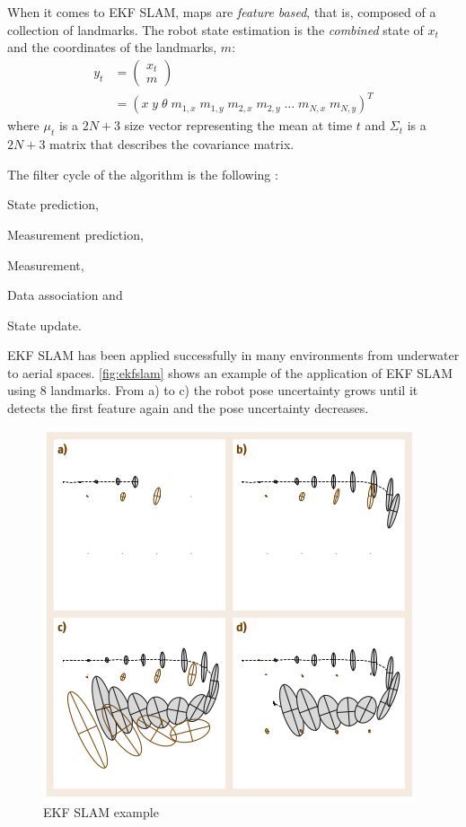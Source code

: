 When it comes to EKF SLAM, maps are \emph{feature based}, that is, composed of a collection of landmarks. The robot state estimation is the \emph{combined} state of $x_t$ and the coordinates of the landmarks, $m$:
\begin{equation}
  \begin{split}
    y_t & = \begin{pmatrix} x_t \\ m \end{pmatrix} \\
        & = (x\; y\; \theta\; m_{1,x}\; m_{1,y}\; m_{2,x}\; m_{2,y}\; \ldots\; m_{N,x}\; m_{N,y})^T
  \end{split}
  \label{eq:combinedstate}
\end{equation}  
where $\mu_t$ is a $2N+3$ size vector representing the mean at time $t$ and $\Sigma_t$ is a $2N+3$ matrix that describes the covariance matrix.

The filter cycle of the algorithm is the following : \begin{enumerate*} \item State prediction, \item Measurement prediction, \item Measurement, \item Data association and \item State update.\end{enumerate*}
 

EKF SLAM has been applied successfully in many environments from underwater to aerial spaces. \autoref{fig:ekfslam} shows an example of the application of EKF SLAM using 8 landmarks. From a) to c) the robot pose uncertainty grows until it detects the first feature again and the pose uncertainty decreases.

\begin{figure}[t]
  \centering
  \includegraphics[width=.9\linewidth]{pictures/03/ekf}
  \caption{EKF SLAM example}
  \label{fig:ekfslam}
\end{figure} 


